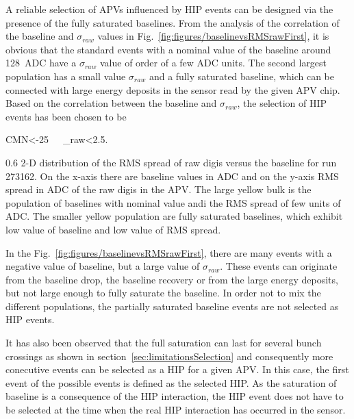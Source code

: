 A reliable selection of APVs influenced by HIP events can be designed via the presence of the fully saturated baselines. From the analysis of the correlation of the baseline and $\sigma_{raw}$ values in Fig.~\ref{fig:figures/baselinevsRMSrawFirst}, it is obvious that the standard events with a nominal value of the baseline around 128~ADC have a $\sigma_{raw}$ value of order of a few ADC units. The second largest population has a small value $\sigma_{raw}$ and a fully saturated baseline, which can be connected with large energy deposits in the sensor read by the given APV chip. Based on the correlation between the baseline and $\sigma_{raw}$, the selection of HIP events has been chosen to be 

{
CMN<-25~~~\sigma_{raw}<2.5.
}

                 {0.6}       %
                 {2-D distribution of the RMS spread of raw digis versus the baseline for run 273162. On the x-axis there are baseline values in ADC and on the y-axis RMS spread in ADC of the raw digis in the APV. The large yellow bulk is the population of baselines with nominal value andi the RMS spread of few units of ADC. The smaller yellow population are fully saturated baselines, which exhibit low value of baseline and low value of RMS spread. } %

In the Fig.~\ref{fig:figures/baselinevsRMSrawFirst}, there are many events with a negative value of baseline, but a large value of $\sigma_{raw}$. These events can originate from the baseline drop, the baseline recovery or from the large energy deposits, but not large enough to fully saturate the baseline. In order not to mix the different populations, the partially saturated baseline events are not selected as HIP events. 

It has also been observed that the full saturation can last for several bunch crossings as shown in section~\ref{sec:limitationsSelection} and consequently more conecutive events can be selected as a HIP for a given APV. In this case, the first event of the possible events is defined as the selected HIP. As the saturation of baseline is a consequence of the HIP interaction, the HIP event does not have to be selected at the time when the real HIP interaction has occurred in the sensor. 


